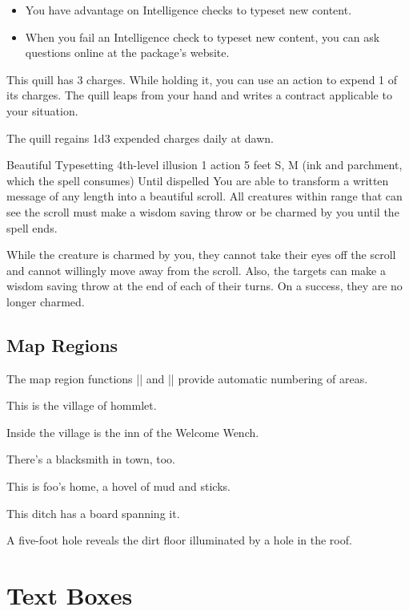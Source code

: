 \documentclass[letterpaper,twocolumn,openany,nodeprecatedcode]{dndbook}
\begin{document}
\begin{itemize}
  \item You have advantage on Intelligence checks to typeset new content.
  \item When you fail an Intelligence check to typeset new content, you can ask questions online at the package's website.
\end{itemize}

This quill has 3 charges. While holding it, you can use an action to expend 1 of its charges. The quill leaps from your hand and writes a contract applicable to your situation.

The quill regains 1d3 expended charges daily at dawn.

\DndSpellHeader%
  {Beautiful Typesetting}
  {4th-level illusion}
  {1 action}
  {5 feet}
  {S, M (ink and parchment, which the spell consumes)}
  {Until dispelled}
You are able to transform a written message of any length into a beautiful scroll. All creatures within range that can see the scroll must make a wisdom saving throw or be charmed by you until the spell ends.

While the creature is charmed by you, they cannot take their eyes off the scroll and cannot willingly move away from the scroll. Also, the targets can make a wisdom saving throw at the end of each of their turns. On a success, they are no longer charmed.

\section{Map Regions}
The map region functions |\DndArea| and |\DndSubArea| provide automatic numbering of areas.

This is the village of hommlet.

Inside the village is the inn of the Welcome Wench.

There's a blacksmith in town, too.

This is foo's home, a hovel of mud and sticks.

This ditch has a board spanning it.

A five-foot hole reveals the dirt floor illuminated by a hole in the roof.

\chapter{Text Boxes}
\end{document}
